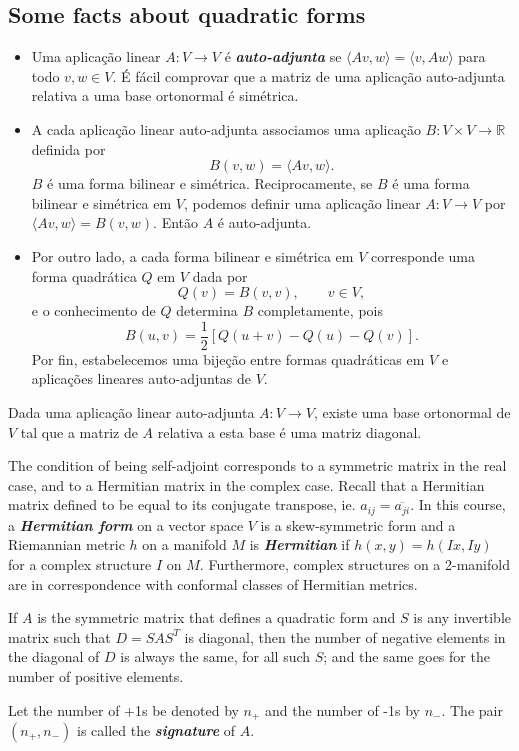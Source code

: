 \documentclass{article}
\numberwithin{equation}{section}
\newcommand{\R}{\mathbb{R}}
\begin{document}
	\subsection*{Some facts about quadratic forms}
	\begin{defn}\leavevmode
		\begin{itemize}
			\item Uma aplicação linear $A:V\to V$ é \textbf{\textit{auto-adjunta}} se $\langle Av,w\rangle=\langle v,Aw\rangle$ para todo $v,w\in V$. É fácil comprovar que a matriz de uma aplicação auto-adjunta relativa a uma base ortonormal é simétrica.
			\item A cada aplicação linear auto-adjunta associamos uma aplicação $B:V\times V\to \R$ definida por
			\[B(v,w)=\langle Av,w\rangle.\]
			$B$ é uma forma bilinear e simétrica. Reciprocamente, se $B$ é uma forma bilinear e simétrica em $V$, podemos definir uma aplicação linear $A:V\to V$ por $\langle Av,w\rangle=B(v,w)$. Então $A$ é auto-adjunta.
			\item Por outro lado, a cada forma bilinear e simétrica em $V$ corresponde uma forma quadrática $Q$ em $V$ dada por
			\[Q(v)=B(v,v),\qquad v\in V,\]
			e o conhecimento de $Q$ determina $B$ completamente, pois
			\[B(u,v)=\frac{1}{2}[Q(u+v)-Q(u)-Q(v)].\]
			Por fin, estabelecemos uma bijeção entre formas quadráticas em $V$ e aplicações lineares auto-adjuntas de $V$.
		\end{itemize}
	\end{defn}
	\begin{thm}
		Dada uma aplicação linear auto-adjunta $A:V\to V$, existe uma base ortonormal de $V$ tal que a matriz de $A$ relativa a esta base é uma matriz diagonal.
	\end{thm}
	\begin{remark}
		The condition of being self-adjoint corresponds to a symmetric matrix in the real case, and to a Hermitian matrix in the complex case. Recall that a Hermitian matrix defined to be equal to its conjugate transpose, ie. $a_{ij}=\overline{a_{ji}}$. In this course, a \textbf{\textit{Hermitian form}} on a vector space $V$ is a skew-symmetric form and a Riemannian metric $h$ on a manifold $M$ is \textbf{\textit{Hermitian}} if $h(x,y)=h(Ix,Iy)$ for a complex structure $I$ on $M$. Furthermore, complex structures on a 2-manifold are in correspondence with conformal classes of Hermitian metrics.
	\end{remark}
	\begin{thm}
		If $A$ is the symmetric matrix that defines a quadratic form and $S$ is any invertible matrix such that $D=SAS^T$ is diagonal, then the number of negative elements in the diagonal of $D$ is always the same, for all such $S$; and the same goes for the number of positive elements.
	\end{thm}
	\begin{defn}
		Let the number of +1s be denoted by $n_+$ and the number of -1s by $n_-$. The pair $(n_+,n_-)$ is called the \textbf{\textit{signature}} of $A$.
	\end{defn}
\end{document}
